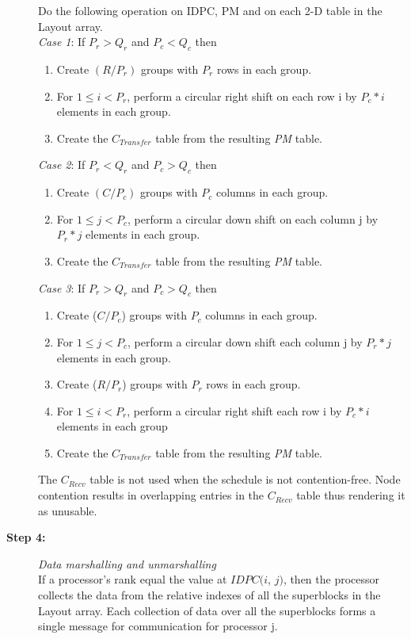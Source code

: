 \documentclass[letterpaper]{llncs}
\begin{document}
\begin{description}
Do the following operation on IDPC, PM and on each 2-D table in the Layout array.\\
\noindent
\textit{Case 1}: If $P_{r} > Q_{r}$ and $P_{c}<Q_{c}$ then
\begin{enumerate}
\item Create $(R/ P_{r})$ groups with $P_{r}$ rows in each group.
\item For $1\leq i<P_r$, perform a circular right shift on each row i by $P_{c} \ast i$ elements in each group.
\item Create the $C_{Transfer}$ table from the resulting \textit{PM} table.
\end{enumerate}

\noindent
\textit{Case 2}: If $P_{r} < Q_{r}$ and $P_{c}>Q_{c}$ then
\begin{enumerate}
\item Create $(C/P_{c})$ groups with $P_{c}$ columns in each group.
\item For $1\leq j<P_c$, perform a circular down shift on each column j by $P_{r} \ast j$ elements in each group.
\item Create the $C_{Transfer}$ table from the resulting \textit{PM} table.
\end{enumerate}

\noindent
\textit{Case 3}: If $P_{r} > Q_{r}$ and $P_{c} > Q_{c}$ then 
\begin{enumerate}
\item Create ($C/ P_{c}$) groups with $P_{c}$ columns in each group.
\item For $1\leq j<P_c$, perform a circular down shift each column j by $P_{r} \ast j$ elements in each group.
\item Create ($R/ P_{r}$) groups with $P_{r}$ rows in each group.
\item For $1\leq i<P_r$, perform a circular right shift each row i by $P_{c} \ast i$ elements in each group
\item Create the $C_{Transfer}$ table from the resulting \textit{PM} table.
\end{enumerate}

The $C_{Recv}$ table is not used when the schedule is not contention-free. Node contention results in  overlapping entries in the $C_{Recv}$ table 
thus rendering it as unusable.

\item[\textbf{Step 4:}] \hspace{0.05in}\textit{Data marshalling and unmarshalling}\\
If a processor's rank equal the value at $IDPC(i$, $j)$, then  
the processor collects the data from the relative indexes of all the superblocks in the Layout array. Each collection of data
over all the superblocks forms a single message for communication for processor j.


\end{description}
\end{document}
